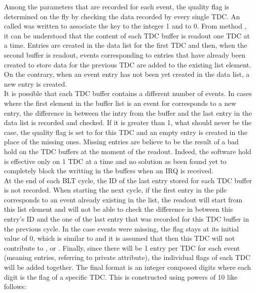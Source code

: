	Among the parameters that are recorded for each event, the quality flag is determined on the fly by checking the data recorded by every single TDC. An  called  was written to associate the key  to the integer 1 and  to 0. From method , it can be understood that the content of each TDC buffer is readout one TDC at a time. Entries are created in the data list for the first TDC and then, when the second buffer is readout, events corresponding to entries that have already been created to store data for the previous TDC are added to the existing list element. On the contrary, when an event entry has not been yet created in the data list, a new entry is created.\\
	It is possible that each TDC buffer contains a different number of events. In cases where the first element in the buffer list is an event for corresponds to a new entry, the difference in between the intry from the buffer and the last entry in the data list is recorded and checked. If it is greater than 1, what should never be the case, the quality flag is set to  for this TDC and an empty entry is created in the place of the missing ones. Missing entries are believe to be the result of a bad hold on the TDC buffers at the moment of the readout. Indeed, the software hold is effective only on 1 TDC at a time and no solution as been found yet to completely block the writting in the buffers when an IRQ is received.\\
	At the end of each BLT cycle, the ID of the last entry stored for each TDC buffer is not recorded. When starting the next cycle, if the first entry in the pile corresponds to an event already existing in the list, the readout will start from this list element and will not be able to check the difference in between this entry's ID and the one of the last entry that was recorded for this TDC buffer in the previous cycle. In the case events were missing, the flag stays at its initial value of 0, which is similar to  and it is assumed that then this TDC will not contribute to ,  or .
	Finally, since there will be 1  entry per TDC for each event (meaning  entries, referring to  private attribute), the individual flags of each TDC will be added together. The final format is an integer composed  digits where each digit is the flag of a specific TDC. This is constructed using powers of 10 like follows:
	
